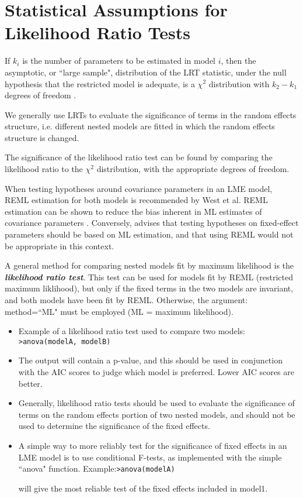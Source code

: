 \documentclass[12pt, a4paper]{report}
\theoremstyle{plain}
\theoremstyle{definition}
\theoremstyle{remark}
\begin{document}
\section{Statistical Assumptions for Likelihood Ratio Tests}


If $k_i$ is the number of parameters to be estimated in model $i$, then the asymptotic, or ``large sample", distribution of the LRT statistic, under the null hypothesis that the restricted model is adequate, is a $\chi^2$ distribution with $k_2-k_1$ degrees of freedom \citep[pg.83]{pb}.

We generally use LRTs to evaluate the significance of terms in the random effects structure, i.e. different nested models are fitted in which the random effects structure is changed.

The significance of the likelihood ratio test can be found by comparing the likelihood ratio to the $\chi^2$ distribution, with the appropriate degrees of freedom.

When testing hypotheses around covariance parameters in an LME model, REML estimation for both models is recommended by West et al. REML estimation can be shown to reduce the bias inherent in ML estimates of covariance parameters \citep{west}. Conversely, \citet{pb} advises that testing hypotheses on fixed-effect parameters should be based on ML estimation, and that using REML would not be appropriate in this context.







A general method for comparing nested models fit by maximum likelihood is the \textbf{\emph{likelihood ratio test}}. This test can be used for models fit by REML (restricted maximum liklihood), but only if the fixed terms in the two models are invariant, and both models have been fit by REML. Otherwise, the argument: method=``ML" must be employed (ML = maximum likelihood).

\begin{itemize}
	\item Example of a likelihood ratio test used to compare two models: \newline \texttt{>anova(modelA, modelB)}
	
	\item The output will contain a p-value, and this should be used in conjunction with the AIC scores to judge which model is preferred. Lower AIC scores are better.
	
	\item Generally, likelihood ratio tests should be used to evaluate the significance of terms on the
	random effects portion of two nested models, and should not be used to determine the significance of the fixed effects.
	\item A simple way to more reliably test for the significance of fixed effects in an LME model is to use
	conditional F-tests, as implemented with the simple ``anova" function.
	Example:\newline \texttt{>anova(modelA)}
	
	
	will give the most reliable test of the fixed effects included in model1.
\end{itemize}
\end{document}
